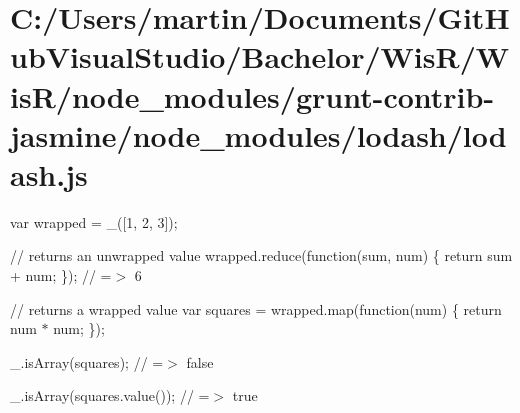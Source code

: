 \hypertarget{_c_1_2_users_2martin_2_documents_2_git_hub_visual_studio_2_bachelor_2_wis_r_2_wis_r_2node_modulec47812ef7ee63cf6c5bd869c7a0b4fdc}{}\section{C\+:/\+Users/martin/\+Documents/\+Git\+Hub\+Visual\+Studio/\+Bachelor/\+Wis\+R/\+Wis\+R/node\+\_\+modules/grunt-\/contrib-\/jasmine/node\+\_\+modules/lodash/lodash.\+js}
var wrapped = \+\_\+(\mbox{[}1, 2, 3\mbox{]});

// returns an unwrapped value wrapped.\+reduce(function(sum, num) \{ return sum + num; \}); // =$>$ 6

// returns a wrapped value var squares = wrapped.\+map(function(num) \{ return num $\ast$ num; \});

\+\_\+.\+is\+Array(squares); // =$>$ false

\+\_\+.\+is\+Array(squares.\+value()); // =$>$ true


